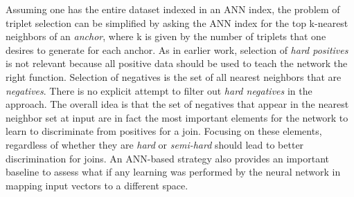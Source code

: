 Assuming one has the entire dataset indexed in an ANN index, the problem of triplet selection can be simplified by asking the ANN index for the top k-nearest neighbors of an \textit{anchor}, where k is given by the number of triplets that one desires to generate for each anchor.  As in earlier work, selection of \textit{hard positives} is not relevant because all positive data should be used to teach the network the right function.  Selection of negatives is the set of all nearest neighbors that are \textit{negatives}.  There is no explicit attempt to filter out \textit{hard negatives} in the approach.  The overall idea is that the set of negatives that appear in the nearest neighbor set at input are in fact the most important elements for the network to learn to discriminate from positives for a join.  Focusing on these elements, regardless of whether they are \textit{hard} or \textit{semi-hard} should lead to better discrimination for joins.  An ANN-based strategy also provides an important baseline to assess what if any learning was performed by the neural network in mapping input vectors to a different space.

